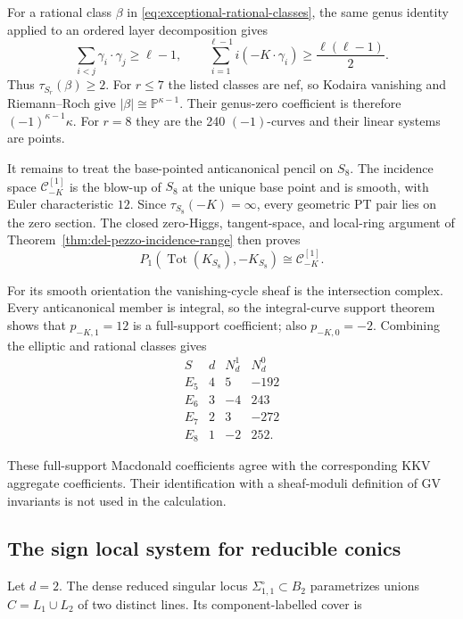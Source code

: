 \documentclass[11pt,reqno]{amsart}
\theoremstyle{definition}
\newcommand{\Pp}{\mathbb P}
\newcommand{\Tot}{\operatorname{Tot}}
\begin{document}
For a rational class $\beta$ in
\eqref{eq:exceptional-rational-classes}, the same genus identity applied to
an ordered layer decomposition gives
\[
 \sum_{i<j}\gamma_i\cdot\gamma_j\ge\ell-1,
 \qquad
 \sum_{i=1}^{\ell-1}i(-K\cdot\gamma_i)
 \ge\frac{\ell(\ell-1)}2.
\]
Thus $\tau_{S_r}(\beta)\ge2$.  For $r\le7$ the listed classes are nef, so
Kodaira vanishing and Riemann--Roch give
$|\beta|\cong\Pp^{\kappa-1}$.  Their genus-zero coefficient is therefore
$(-1)^{\kappa-1}\kappa$.  For $r=8$ they are the 240 $(-1)$-curves and
their linear systems are points.

It remains to treat the base-pointed anticanonical pencil on $S_8$.  The
incidence space $\mathcal C_{-K}^{[1]}$ is the blow-up of $S_8$ at the
unique base point and is smooth, with Euler characteristic $12$.  Since
$\tau_{S_8}(-K)=\infty$, every geometric PT pair lies on the zero section.
The closed zero-Higgs, tangent-space, and local-ring argument of
Theorem~\ref{thm:del-pezzo-incidence-range} then proves
\[
 P_1(\Tot(K_{S_8}),-K_{S_8})\cong\mathcal C_{-K}^{[1]}.
\]

For its smooth orientation the vanishing-cycle sheaf is the intersection
complex.  Every anticanonical member is integral, so the integral-curve
support theorem shows that $p_{-K,1}=12$ is a full-support coefficient;
also $p_{-K,0}=-2$.  Combining the elliptic and rational classes gives
\begin{equation}\label{eq:exceptional-aggregate-table}
\boxed{
\begin{array}{c|c|rr}
S&d&N_d^1&N_d^0\\ \hline
E_5&4&5&-192\\
E_6&3&-4&243\\
E_7&2&3&-272\\
E_8&1&-2&252.
\end{array}}
\end{equation}

These full-support Macdonald coefficients agree with the corresponding KKV
aggregate coefficients.  Their
identification with a sheaf-moduli definition of GV invariants is not used
in the calculation.

\subsection{The sign local system for reducible conics}

Let $d=2$.  The dense reduced singular locus
$\Sigma_{1,1}^\circ\subset B_2$ parametrizes unions
$C=L_1\cup L_2$ of two distinct lines.  Its component-labelled cover is
\end{document}
